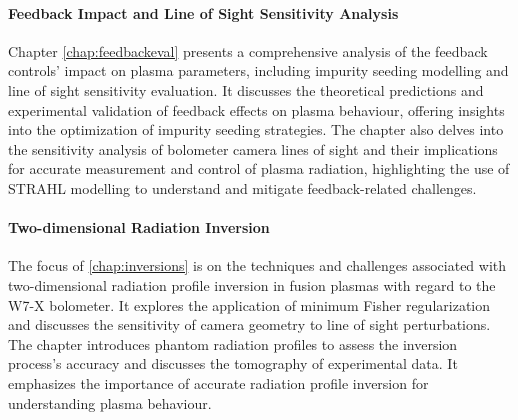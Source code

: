     \paragraph*{Feedback Impact and Line of Sight Sensitivity Analysis}%
%
        Chapter \ref{chap:feedbackeval} presents a comprehensive analysis of the feedback controls' impact on plasma parameters, including impurity seeding modelling and line of sight sensitivity evaluation. It discusses the theoretical predictions and experimental validation of feedback effects on plasma behaviour, offering insights into the optimization of impurity seeding strategies. The chapter also delves into the sensitivity analysis of bolometer camera lines of sight and their implications for accurate measurement and control of plasma radiation, highlighting the use of STRAHL modelling to understand and mitigate feedback-related challenges.%
%
    \paragraph*{Two-dimensional Radiation Inversion}%
%
        The focus of \cref{chap:inversions} is on the techniques and challenges associated with two-dimensional radiation profile inversion in fusion plasmas with regard to the W7-X bolometer. It explores the application of minimum Fisher regularization and discusses the sensitivity of camera geometry to line of sight perturbations. The chapter introduces phantom radiation profiles to assess the inversion process's accuracy and discusses the tomography of experimental data. It emphasizes the importance of accurate radiation profile inversion for understanding plasma behaviour.%
%